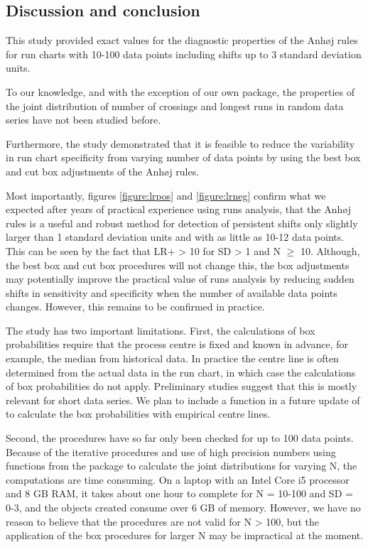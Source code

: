 \hypertarget{discussion-and-conclusion}{%
\subsection{Discussion and conclusion}\label{discussion-and-conclusion}}

This study provided exact values for the diagnostic properties of the
Anhøj rules for run charts with 10-100 data points including shifts up
to 3 standard deviation units.

To our knowledge, and with the exception of our own 
package, the properties of the joint distribution of number of crossings
and longest runs in random data series have not been studied before.

Furthermore, the study demonstrated that it is feasible to reduce the
variability in run chart specificity from varying number of data points
by using the best box and cut box adjustments of the Anhøj rules.

Most importantly, figures \ref{figure:lrpos} and \ref{figure:lrneg}
confirm what we expected after years of practical experience using runs
analysis, that the Anhøj rules is a useful and robust method for
detection of persistent shifts only slightly larger than 1 standard
deviation units and with as little as 10-12 data points. This can be
seen by the fact that LR+ \textgreater{} 10 for SD \textgreater{} 1 and
N \(\geq\) 10. Although, the best box and cut box procedures will not
change this, the box adjustments may potentially improve the practical
value of runs analysis by reducing sudden shifts in sensitivity and
specificity when the number of available data points changes. However,
this remains to be confirmed in practice.

The study has two important limitations. First, the calculations of box
probabilities require that the process centre is fixed and known in
advance, for example, the median from historical data. In practice the
centre line is often determined from the actual data in the run chart,
in which case the calculations of box probabilities do not apply.
Preliminary studies suggest that this is mostly relevant for short data
series. We plan to include a function in a future update of
 to calculate the box probabilities with empirical
centre lines.

Second, the procedures have so far only been checked for up to 100 data
points. Because of the iterative procedures and use of high precision
numbers using functions from the  package \citep{rmpfr}
to calculate the joint distributions for varying N, the computations are
time consuming. On a laptop with an Intel Core i5 processor and 8 GB
RAM, it takes about one hour to complete  for N =
10-100 and SD = 0-3, and the objects created consume over 6 GB of
memory. However, we have no reason to believe that the procedures are
not valid for N \textgreater{} 100, but the application of the box
procedures for larger N may be impractical at the moment.


